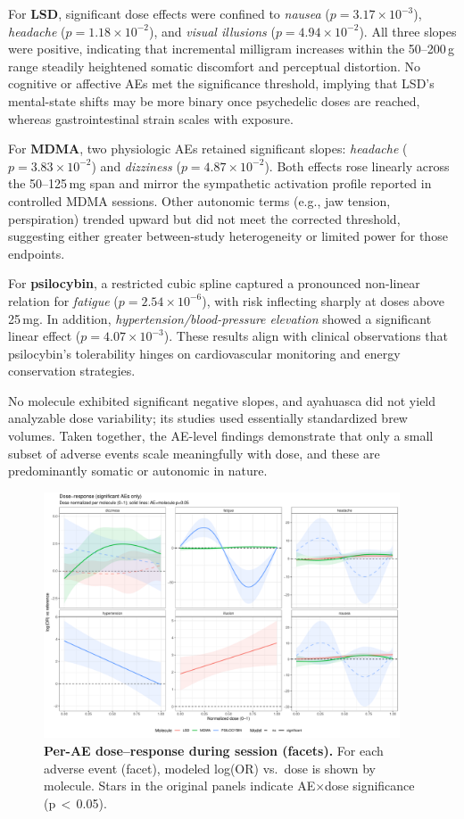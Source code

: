 For \textbf{LSD}, significant dose effects were confined to \textit{nausea} ($p=3.17\times10^{-3}$), \textit{headache} ($p=1.18\times10^{-2}$), and \textit{visual illusions} ($p=4.94\times10^{-2}$).
All three slopes were positive, indicating that incremental milligram increases within the 50--200\,\textmu g range steadily heightened somatic discomfort and perceptual distortion.
No cognitive or affective AEs met the significance threshold, implying that LSD’s mental-state shifts may be more binary once psychedelic doses are reached, whereas gastrointestinal strain scales with exposure.

For \textbf{MDMA}, two physiologic AEs retained significant slopes: \textit{headache} ($p=3.83\times10^{-2}$) and \textit{dizziness} ($p=4.87\times10^{-2}$).
Both effects rose linearly across the 50--125\,mg span and mirror the sympathetic activation profile reported in controlled MDMA sessions.
Other autonomic terms (e.g., jaw tension, perspiration) trended upward but did not meet the corrected threshold, suggesting either greater between-study heterogeneity or limited power for those endpoints.

For \textbf{psilocybin}, a restricted cubic spline captured a pronounced non-linear relation for \textit{fatigue} ($p=2.54\times10^{-6}$), with risk inflecting sharply at doses above 25\,mg.
In addition, \textit{hypertension/blood-pressure elevation} showed a significant linear effect ($p=4.07\times10^{-3}$).
These results align with clinical observations that psilocybin’s tolerability hinges on cardiovascular monitoring and energy conservation strategies.

No molecule exhibited significant negative slopes, and ayahuasca did not yield analyzable dose variability; its studies used essentially standardized brew volumes.
Taken together, the AE-level findings demonstrate that only a small subset of adverse events scale meaningfully with dose, and these are predominantly somatic or autonomic in nature.


\begin{figure}[htb]
  \centering
  \includegraphics[width=0.94\textwidth]{figures/master_dr_by_ae-session.pdf}
  \caption{\textbf{Per-AE dose–response during session (facets).}
  For each adverse event (facet), modeled log(OR) vs.\ dose is shown by molecule. Stars in the original panels indicate AE$\times$dose significance (p\,$<\,$0.05).}
  \label{fig:dr-by-ae-session}
\end{figure}

